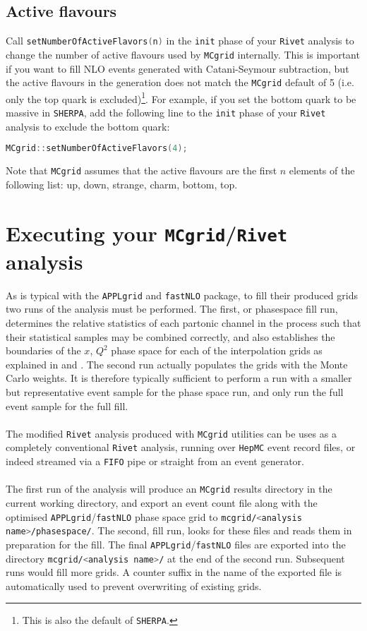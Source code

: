 \documentclass[11pt]{article}
\newcommand{\mcgrid} {{\tt MCgrid}\xspace}
\newcommand{\rivet} {{\tt Rivet}\xspace}
\newcommand{\appl} {{\tt APPLgrid}\xspace}
\newcommand{\fnlo} {{\tt fastNLO}\xspace}
\newcommand{\sherpa} {{\tt SHERPA}\xspace}
\begin{document}
\subsection{Active flavours}
Call \lstinline[language=c++]{setNumberOfActiveFlavors(n)} in the \lstinline[language=c++]{init} phase of your \rivet analysis to change the number of active flavours used by \mcgrid internally. This is important if you want to fill NLO events generated with Catani-Seymour subtraction, but the active flavours in the generation does not match the \mcgrid default of 5 (i.e. only the top quark is excluded)\footnote{This is also the default of \sherpa.}. For example, if you set the bottom quark to be massive in \sherpa, add the following line to the \lstinline[language=c++]{init} phase of your \rivet analysis to exclude the bottom quark:
\begin{lstlisting}[language=c++]
	MCgrid::setNumberOfActiveFlavors(4);
\end{lstlisting}
Note that \mcgrid assumes that the active flavours are the first $n$ elements of the following list: up, down, strange, charm, bottom, top.

\section{Executing your \mcgrid/\rivet analysis}
As is typical with the \appl and \fnlo package, to fill their produced grids two runs of the analysis must be performed. The first, or phasespace fill run, determines the relative statistics of each partonic channel in the process such that their statistical samples may be combined correctly, and also establishes the boundaries of the $x$, $Q^2$ phase space for each of the interpolation grids as explained in \cite{Carli:2010rw} and \cite{Britzger:2012bs}. The second run actually populates the grids with the Monte Carlo weights. It is therefore typically sufficient to perform a run with a smaller but representative event sample for the phase space run, and only run the full event sample for the full fill.
\\\\
The modified \rivet analysis produced with \mcgrid utilities can be uses as a completely conventional \rivet analysis, running over {\tt HepMC} event record files, or indeed streamed via a {\tt FIFO} pipe or straight from an event generator. \\\\
The first run of the analysis will produce an \mcgrid results directory in the current working directory, and export an event count file along with the optimised \appl/\fnlo phase space grid to \lstinline[language=bash]{mcgrid/<analysis name>/phasespace/}. The second, fill run, looks for these files and reads them in preparation for the fill. The final \appl/\fnlo files are exported into the directory \lstinline[language=bash]{mcgrid/<analysis name>/} at the end of the second run.
Subsequent runs would fill more grids. A counter suffix in the name of the exported file is automatically used to prevent overwriting of existing grids.
\end{document}
